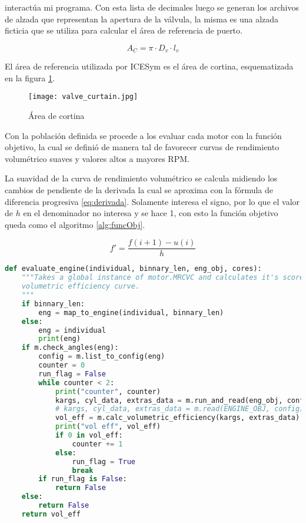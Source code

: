 interactúa mi programa.  Con esta lista de decimales luego se generan los
archivos de alzada que representan la apertura de la válvula, la misma es una
alzada ficticia que se utiliza para calcular el área de referencia de puerto.

\begin{equation}
  A_{C} = \pi \cdot D_{v}\cdot l_{v}
\end{equation}

El área de referencia utilizada por ICESym es el área de cortina, esquematizada
en la figura \ref{fig:area_cortina}.

\begin{figure}
  \centering
  \texttt{[image: valve\_curtain.jpg]}
  \caption{Área de cortina}
  \label{fig:area_cortina}
\end{figure}

Con la población definida se procede a los evaluar cada motor con la función
objetivo, la cual se definió de manera tal de favorecer curvas de rendimiento
volumétrico suaves y valores altos a mayores RPM.

La suavidad de la curva de rendimiento volumétrico se calcula midiendo los
cambios de pendiente de la derivada la cual se aproxima con la fórmula de
diferencia progresiva \ref{eq:derivada}.
%
Solamente interesa el signo, por lo que el valor de $h$ en el denominador no
interesa y se hace 1, con esto la función objetivo queda como el algoritmo
\ref{alg:funcObj}.

\begin{equation}
  f' = \frac{f(i+1) - u(i)}{h}
  \label{eq:derivada}
\end{equation}

\begin{lstlisting}[language=Python]
def evaluate_engine(individual, binnary_len, eng_obj, cores):
    """Takes a global instance of motor.MRCVC and calculates it's score based on
    volumetric efficiency curve.
    """
    if binnary_len:
        eng = map_to_engine(individual, binnary_len)
    else:
        eng = individual
        print(eng)
    if m.check_angles(eng):
        config = m.list_to_config(eng)
        counter = 0
        run_flag = False
        while counter < 2:
            print("counter", counter)
            kargs, cyl_data, extras_data = m.run_and_read(eng_obj, config, multi=cores)
            # kargs, cyl_data, extras_data = m.read(ENGINE_OBJ, config)
            vol_eff = m.calc_volumetric_efficiency(kargs, extras_data)
            print("vol eff", vol_eff)
            if 0 in vol_eff:
                counter += 1
            else:
                run_flag = True
                break
        if run_flag is False:
            return False
    else:
        return False
    return vol_eff
\end{lstlisting}

